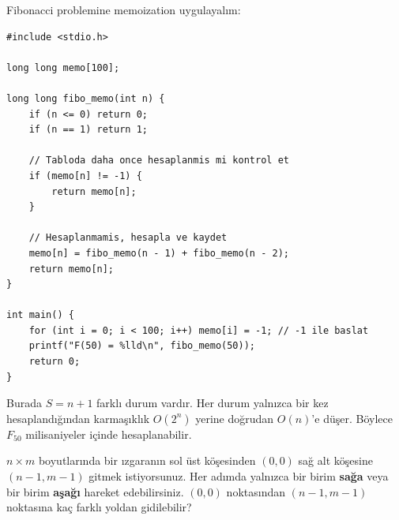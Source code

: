 Fibonacci problemine memoization uygulayalım:

\begin{lstlisting}[language=CTemel]
#include <stdio.h>

long long memo[100];

long long fibo_memo(int n) {
    if (n <= 0) return 0;
    if (n == 1) return 1;
    
    // Tabloda daha once hesaplanmis mi kontrol et
    if (memo[n] != -1) {
        return memo[n];
    }
    
    // Hesaplanmamis, hesapla ve kaydet
    memo[n] = fibo_memo(n - 1) + fibo_memo(n - 2);
    return memo[n];
}

int main() {
    for (int i = 0; i < 100; i++) memo[i] = -1; // -1 ile baslat
    printf("F(50) = %lld\n", fibo_memo(50));
    return 0;
}
\end{lstlisting}
Burada $S = n+1$ farklı durum vardır. Her durum yalnızca bir kez hesaplandığından karmaşıklık $O(2^n)$ yerine doğrudan $O(n)$'e düşer. Böylece $F_{50}$ milisaniyeler içinde hesaplanabilir.

\begin{example}
$n \times m$ boyutlarında bir ızgaranın sol üst köşesinden $(0,0)$ sağ alt köşesine $(n-1, m-1)$ gitmek istiyorsunuz. Her adımda yalnızca bir birim \textbf{sağa} veya bir birim \textbf{aşağı} hareket edebilirsiniz. $(0,0)$ noktasından $(n-1, m-1)$ noktasına kaç farklı yoldan gidilebilir?
\end{example}

